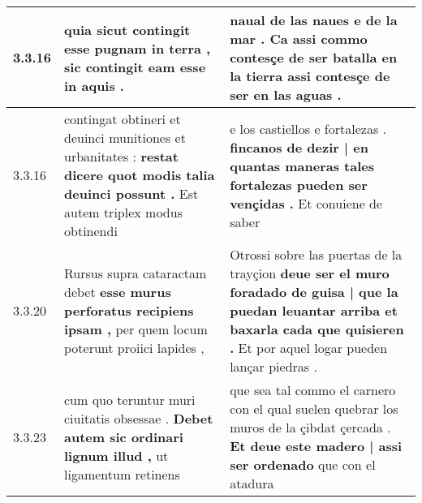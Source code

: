 \begin{tabular}{|p{1cm}|p{6.5cm}|p{6.5cm}|}
3.3.16 & quia sicut contingit \textbf{ esse pugnam in terra , } sic contingit eam esse in aquis . & naual de las naues e de la mar . \textbf{ Ca assi commo contesçe de ser batalla en la tierra } assi contesçe de ser en las aguas . \\\hline
3.3.16 & contingat obtineri et deuinci munitiones et urbanitates : \textbf{ restat dicere quot modis talia deuinci possunt . } Est autem triplex modus obtinendi & e los castiellos e fortalezas . \textbf{ fincanos de dezir | en quantas maneras tales fortalezas pueden ser vençidas . } Et conuiene de saber \\\hline
3.3.20 & Rursus supra cataractam debet \textbf{ esse murus perforatus recipiens ipsam , } per quem locum poterunt proiici lapides , & Otrossi sobre las puertas de la trayçion \textbf{ deue ser el muro foradado de guisa | que la puedan leuantar arriba et baxarla cada que quisieren . } Et por aquel logar pueden lançar piedras . \\\hline
3.3.23 & cum quo teruntur muri ciuitatis obsessae . \textbf{ Debet autem sic ordinari lignum illud , } ut ligamentum retinens & que sea tal commo el carnero con el qual suelen quebrar los muros de la çibdat çercada . \textbf{ Et deue este madero | assi ser ordenado } que con el atadura \\\hline

\end{tabular}
